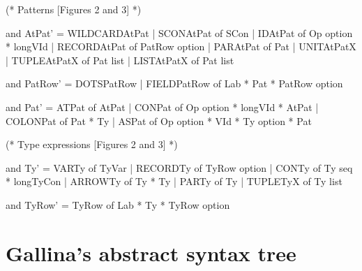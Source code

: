 \documentclass[a4paper,11pt]{article}
\begin{document}
\begin{grm}
  (* Patterns [Figures 2 and 3] *)

  and AtPat' =
      WILDCARDAtPat
    | SCONAtPat   of SCon
    | IDAtPat     of Op option * longVId
    | RECORDAtPat of PatRow option
    | PARAtPat    of Pat
    | UNITAtPatX
    | TUPLEAtPatX of Pat list
    | LISTAtPatX of Pat list


  and PatRow' =
      DOTSPatRow
    | FIELDPatRow of Lab * Pat * PatRow option

  and Pat' =
      ATPat       of AtPat
    | CONPat      of Op option * longVId * AtPat
    | COLONPat    of Pat * Ty
    | ASPat       of Op option * VId * Ty option * Pat


  (* Type expressions [Figures 2 and 3] *)

  and Ty' =
      VARTy    of TyVar
    | RECORDTy of TyRow option
    | CONTy    of Ty seq * longTyCon
    | ARROWTy  of Ty * Ty
    | PARTy    of Ty
    | TUPLETyX  of Ty list

  and TyRow' =
      TyRow    of Lab * Ty * TyRow option
\end{grm}

\section{Gallina's abstract syntax tree}

{}

\end{document}
